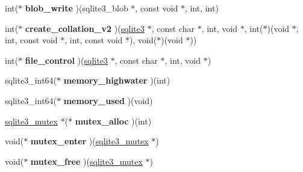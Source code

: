 \begin{DoxyCompactItemize}
\item 
int($\ast$ {\bfseries blob\+\_\+write} )(sqlite3\+\_\+blob $\ast$, const void $\ast$, int, int)\hypertarget{structsqlite3__api__routines_a49a8e111c2b4f033b93820e0199a653e}{}\label{structsqlite3__api__routines_a49a8e111c2b4f033b93820e0199a653e}

\item 
int($\ast$ {\bfseries create\+\_\+collation\+\_\+v2} )(\hyperlink{structsqlite3}{sqlite3} $\ast$, const char $\ast$, int, void $\ast$, int($\ast$)(void $\ast$, int, const void $\ast$, int, const void $\ast$), void($\ast$)(void $\ast$))\hypertarget{structsqlite3__api__routines_afeaa51f6fd046328ba845ebcacdeb335}{}\label{structsqlite3__api__routines_afeaa51f6fd046328ba845ebcacdeb335}

\item 
int($\ast$ {\bfseries file\+\_\+control} )(\hyperlink{structsqlite3}{sqlite3} $\ast$, const char $\ast$, int, void $\ast$)\hypertarget{structsqlite3__api__routines_afe67e4e8a6dd2e44cc24e99e0555b807}{}\label{structsqlite3__api__routines_afe67e4e8a6dd2e44cc24e99e0555b807}

\item 
sqlite3\+\_\+int64($\ast$ {\bfseries memory\+\_\+highwater} )(int)\hypertarget{structsqlite3__api__routines_a56ce6c9b67e916c6c1aeda3aafbaa5da}{}\label{structsqlite3__api__routines_a56ce6c9b67e916c6c1aeda3aafbaa5da}

\item 
sqlite3\+\_\+int64($\ast$ {\bfseries memory\+\_\+used} )(void)\hypertarget{structsqlite3__api__routines_a6e43dd2050d1ee2f2a178b698bed2aeb}{}\label{structsqlite3__api__routines_a6e43dd2050d1ee2f2a178b698bed2aeb}

\item 
\hyperlink{structsqlite3__mutex}{sqlite3\+\_\+mutex} $\ast$($\ast$ {\bfseries mutex\+\_\+alloc} )(int)\hypertarget{structsqlite3__api__routines_aa488c7c4df22d6a412635a7b15ace4a4}{}\label{structsqlite3__api__routines_aa488c7c4df22d6a412635a7b15ace4a4}

\item 
void($\ast$ {\bfseries mutex\+\_\+enter} )(\hyperlink{structsqlite3__mutex}{sqlite3\+\_\+mutex} $\ast$)\hypertarget{structsqlite3__api__routines_a8da853b8ddd55bdb71e3cb82bf6fa77a}{}\label{structsqlite3__api__routines_a8da853b8ddd55bdb71e3cb82bf6fa77a}

\item 
void($\ast$ {\bfseries mutex\+\_\+free} )(\hyperlink{structsqlite3__mutex}{sqlite3\+\_\+mutex} $\ast$)\hypertarget{structsqlite3__api__routines_a055c0e268a30b76af04f7cfac6ad2b6d}{}\label{structsqlite3__api__routines_a055c0e268a30b76af04f7cfac6ad2b6d}


\end{DoxyCompactItemize}

